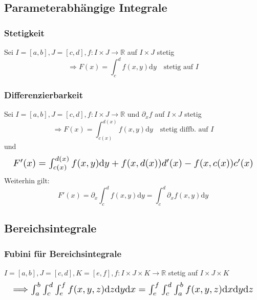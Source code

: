 \subsection{Parameterabhängige Integrale}
\begin{sectionbox}
    \subsubsection{Stetigkeit}
    Sei $I=[a,b], J=[c,d], f:I \times J \rightarrow \mathbb R$ auf $I \times J$ stetig
    \begin{equation*}
        \Longrightarrow F(x)=\int_c^d f(x,y)\mathrm dy \quad \text{stetig auf } I
    \end{equation*}
\end{sectionbox}

\begin{sectionbox}
    \subsubsection{Differenzierbarkeit}
    Sei $I=[a,b], J=[c,d], f:I \times J \rightarrow \mathbb R$ und $\partial_x f$ auf $I \times J$ stetig
    \begin{equation*}
        \Longrightarrow F(x)=\int_{c(x)}^{d(x)} f(x,y)\mathrm dy \quad \text{stetig diffb. auf } I
    \end{equation*}
    und
    \begin{equation*}
        \resizebox{\hsize}{!}
        {
            $F'(x)=\int_{c(x)}^{d(x)} f(x,y)\mathrm dy + f(x, d(x))d'(x) - f(x, c(x))c'(x)$
        }
    \end{equation*}
    Weiterhin gilt:
    \begin{equation*}
        F'(x)=\partial_x \int_{c}^{d} f(x,y)\mathrm dy = \int_{c}^{d}\partial_x f(x,y) \mathrm dy
    \end{equation*}
\end{sectionbox}


\subsection{Bereichsintegrale}
\begin{sectionbox}
    \subsubsection{Fubini für Bereichsintegrale}
    $I=[a,b], J=[c,d], K=[e,f], f: I \times J \times K \rightarrow \mathbb R$ stetig auf $I \times J \times K$
    \begin{equation*}
        \resizebox{\hsize}{!}
        {
            $\Longrightarrow \int_a^b\int_c^d\int_e^f f(x,y,z)\mathrm dz \mathrm dy \mathrm dx = \int_e^f\int_c^d\int_a^b f(x,y,z)\mathrm dx \mathrm dy \mathrm dz$
        }
    \end{equation*}
\end{sectionbox}

